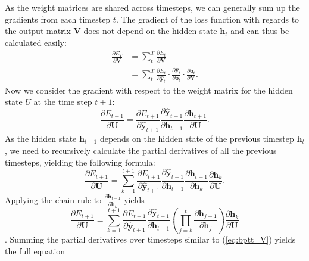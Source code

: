 \documentclass[12pt, a4paper, headinclude, twoside, plainheadsepline, open=right, numbers=noenddot, hidelinks, toc=listof, toc=bibliography]{scrreprt}
\begin{document}
As the weight matrices are shared across timesteps, we can generally sum up the gradients from each timestep $t$.
The gradient of the loss function with regards to the output matrix $\mathbf{V}$ does not depend on the hidden state $\mathbf{h}_t$ and can thus be calculated easily:
\begin{equation}
\label{eq:bptt_V}
\begin{split}
\frac{\partial E_T}{\partial \mathbf{V}} 
& = 
\sum_{t}^{T} \frac{\partial E_t}{\partial \mathbf{V}} \\
& =
\sum_{t}^{T} 
\frac{\partial E_t}{\partial \mathbf{\hat{y}}_t} 
\cdot 
\frac{\partial \mathbf{\hat{y}}_t}{\partial \mathbf{o}_t} 
\cdot 
\frac{\partial \mathbf{o}_t}{\partial \mathbf{V}}.
\end{split}
\end{equation}
Now we consider the gradient with respect to the weight matrix for the hidden state $U$ at the time step $t+1$:
\begin{equation}
\frac{\partial E_{t+1}}{\partial \mathbf{U}} = 
\frac{\partial E_{t+1}}{\partial \mathbf{\hat{y}}_{t+1}}
\frac{\partial \mathbf{\hat{y}}_{t+1}}{\partial \mathbf{h}_{t+1}}
\frac{\partial \mathbf{h}_{t+1}}{\partial \mathbf{U}}.
\end{equation}
As the hidden state $\mathbf{h}_{t+1}$ depends on the hidden state of the previous timestep $\mathbf{h}_t$, we need to recursively calculate the partial derivatives of all the previous timesteps, yielding the following formula:
\begin{equation}
\frac{\partial E_{t+1}}{\partial \mathbf{U}} = \sum_{k=1}^{t+1}
\frac{\partial E_{t+1}}{\partial \mathbf{\hat{y}}_{t+1}}
\frac{\partial \mathbf{\hat{y}}_{t+1}}{\partial \mathbf{h}_{t+1}}
\frac{\partial \mathbf{h}_{t+1}}{\partial \mathbf{h}_k}
\frac{\partial \mathbf{h}_k}{\partial \mathbf{U}}.
\end{equation}
Applying the chain rule to $\frac{\partial \mathbf{h}_{t+1}}{\partial \mathbf{h}_k}$ yields
\begin{equation}
\frac{\partial E_{t+1}}{\partial \mathbf{U}} = \sum_{k=1}^{t+1}
\frac{\partial E_{t+1}}{\partial \mathbf{\hat{y}}_{t+1}}
\frac{\partial \mathbf{\hat{y}}_{t+1}}{\partial \mathbf{h}_{t+1}}
\left(\prod_{j=k}^{t}\frac{\partial \mathbf{h}_{j+1}}{\partial \mathbf{h}_j}\right)
\frac{\partial \mathbf{h}_k}{\partial \mathbf{U}}
\end{equation}\cite{aratBackpropagationTimeRecurrent2019}.
Summing the partial derivatives over timesteps similar to (\ref{eq:bptt_V}) yields the full equation
\end{document}
